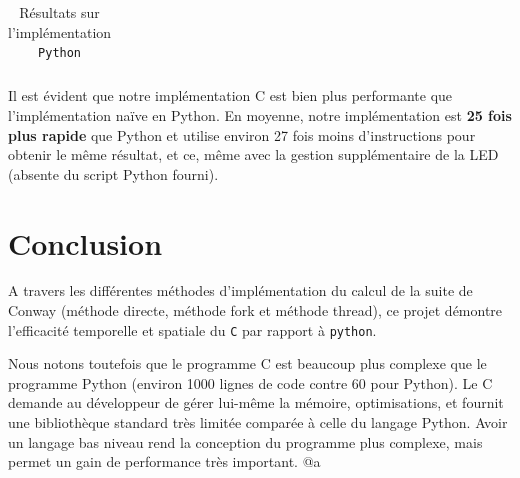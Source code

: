 \documentclass[a4paper,11pt]{article}
\begin{document}
\begin{table}[h]
{\begin{tabular}{c|cl|cl|cl|cl|}
\end{tabular}%
}
\caption{Résultats sur l'implémentation \texttt{Python}}
\label{table:resultat_python}
\end{table}

Il est évident que notre implémentation C est bien plus performante que l'implémentation naïve en Python. En moyenne, notre implémentation est \textbf{25 fois plus rapide} que Python et utilise environ 27 fois moins d'instructions pour obtenir le même résultat, et ce, même avec la gestion supplémentaire de la LED (absente du script Python fourni).

\section{Conclusion}

A travers les différentes méthodes d'implémentation du calcul de la suite de Conway (méthode directe, méthode fork et méthode thread), ce projet démontre l'efficacité temporelle et spatiale du \texttt{C} par rapport à \texttt{python}.

Nous notons toutefois que le programme C est beaucoup plus complexe que le programme Python (environ 1000 lignes de code contre 60 pour Python). Le C demande au développeur de gérer lui-même la mémoire, optimisations, et fournit une bibliothèque standard très limitée comparée à celle du langage Python. Avoir un langage bas niveau rend la conception du programme plus complexe, mais permet un gain de performance très important.
@a
\end{document}
